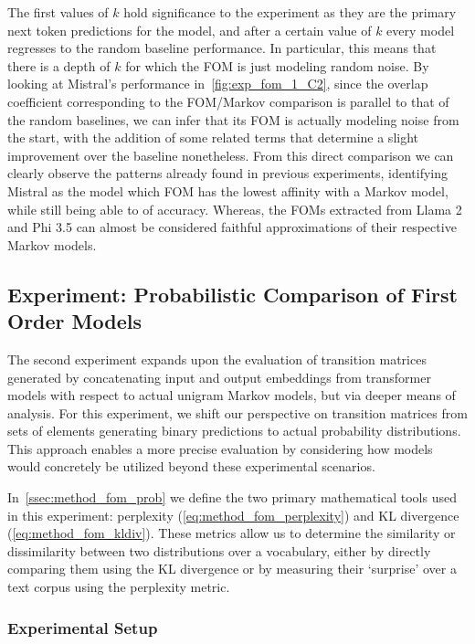 The first values of $k$ hold  significance to the experiment as they are the primary next token predictions for the model, and after a certain value of $k$ every model regresses to the random baseline performance.
In particular, this means that there is a depth of $k$ for which the FOM is just modeling random noise.
By looking at Mistral's performance in~\cref{fig:exp_fom_1_C2}, since the overlap coefficient corresponding to the FOM/Markov comparison is parallel to that of the random baselines, we can infer that its FOM is actually modeling noise from the start, with the addition of some related terms that determine a slight improvement over the baseline nonetheless.
From this direct comparison we can clearly observe the patterns already found in previous experiments, identifying Mistral as the model which FOM has the lowest affinity with a Markov model, while still being able to  of accuracy.
Whereas, the FOMs extracted from Llama 2 and Phi 3.5 can almost be considered faithful approximations of their respective Markov models.

\subsection{Experiment: Probabilistic Comparison of First Order Models}\label{ssec:exp_fom_exp2}

The second experiment expands upon the evaluation of transition matrices generated by concatenating input and output embeddings from transformer models with respect to actual unigram Markov models, but via deeper means of analysis.
For this experiment, we shift our perspective on transition matrices from sets of elements generating binary predictions to actual probability distributions.
This approach enables a more precise evaluation by considering how models would concretely be utilized beyond these experimental scenarios.

In~\cref{ssec:method_fom_prob} we define the two primary mathematical tools used in this experiment: perplexity (\cref{eq:method_fom_perplexity}) and KL divergence (\cref{eq:method_fom_kldiv}).
These metrics allow us to determine the similarity or dissimilarity between two distributions over a vocabulary, either by directly comparing them using the KL divergence or by measuring their `surprise' over a text corpus using the perplexity metric.

\subsubsection{Experimental Setup}

